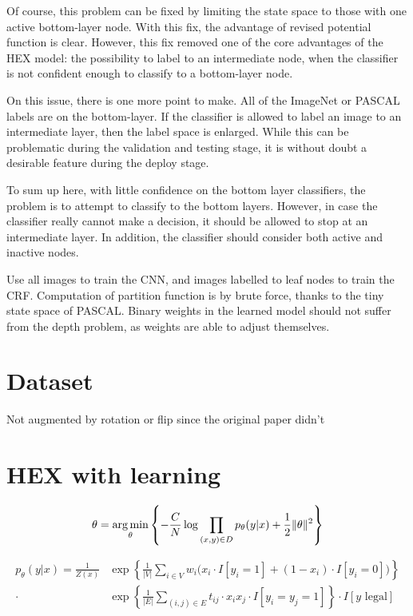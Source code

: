 \documentclass[11pt,a4paper]{article}
\newcommand{\argmin}{\operatornamewithlimits{arg\,min}}
\begin{document}
Of course, this problem can be fixed by limiting the state space to those with one active bottom-layer node. With this fix, the advantage of revised potential function is clear. However, this fix removed one of the core advantages of the HEX model: the possibility to label to an intermediate node, when the classifier is not confident enough to classify to a bottom-layer node.

On this issue, there is one more point to make. All of the ImageNet or PASCAL labels are on the bottom-layer. If the classifier is allowed to label an image to an intermediate layer, then the label space is enlarged. While this can be problematic during the validation and testing stage, it is without doubt a desirable feature during the deploy stage.

To sum up here, with little confidence on the bottom layer classifiers, the problem is to attempt to classify to the bottom layers. However, in case the classifier really cannot make a decision, it should be allowed to stop at an intermediate layer. In addition, the classifier should consider both active and inactive nodes.

Use all images to train the CNN, and images labelled to leaf nodes to train the CRF. Computation of partition function is by brute force, thanks to the tiny state space of PASCAL. Binary weights in the learned model should not suffer from the depth problem, as weights are able to adjust themselves.

\section{Dataset}

Not augmented by rotation or flip since the original paper didn't


\section{HEX with learning}

\[\theta=\argmin_\theta\left\{-\frac{C}{N}\log\prod_{(x,y)\in D}p_\theta(y|x)+\frac{1}{2}\|\theta\|^2\right\}\]

\begin{align*}
p_\theta(y|x)=\frac{1}{Z(x)}&\exp\left\{\frac{1}{|V|}\sum_{i\in V}w_i\big(x_i\cdot I[y_i=1]+(1-x_i)\cdot I[y_i=0]\big)\right\}\\
\cdot&\exp\left\{\frac{1}{|E|}\sum_{(i,j)\in E}t_{ij}\cdot x_ix_j\cdot I[y_i=y_j=1]\right\}\cdot I[y\text{ legal}]
\end{align*}
\end{document}

